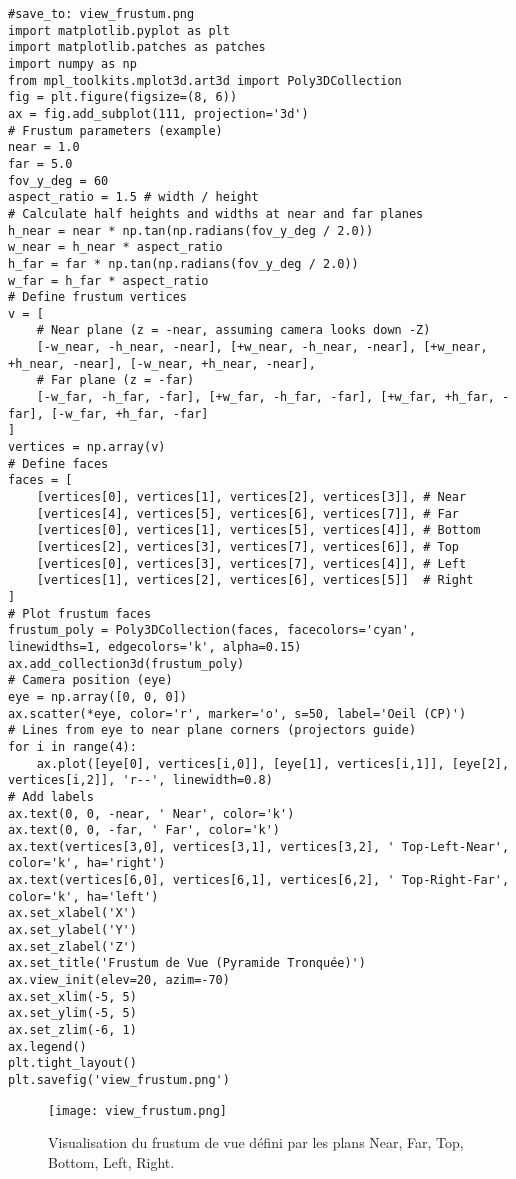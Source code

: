 \begin{verbatim}
#save_to: view_frustum.png
import matplotlib.pyplot as plt
import matplotlib.patches as patches
import numpy as np
from mpl_toolkits.mplot3d.art3d import Poly3DCollection
fig = plt.figure(figsize=(8, 6))
ax = fig.add_subplot(111, projection='3d')
# Frustum parameters (example)
near = 1.0
far = 5.0
fov_y_deg = 60
aspect_ratio = 1.5 # width / height
# Calculate half heights and widths at near and far planes
h_near = near * np.tan(np.radians(fov_y_deg / 2.0))
w_near = h_near * aspect_ratio
h_far = far * np.tan(np.radians(fov_y_deg / 2.0))
w_far = h_far * aspect_ratio
# Define frustum vertices
v = [
    # Near plane (z = -near, assuming camera looks down -Z)
    [-w_near, -h_near, -near], [+w_near, -h_near, -near], [+w_near, +h_near, -near], [-w_near, +h_near, -near],
    # Far plane (z = -far)
    [-w_far, -h_far, -far], [+w_far, -h_far, -far], [+w_far, +h_far, -far], [-w_far, +h_far, -far]
]
vertices = np.array(v)
# Define faces
faces = [
    [vertices[0], vertices[1], vertices[2], vertices[3]], # Near
    [vertices[4], vertices[5], vertices[6], vertices[7]], # Far
    [vertices[0], vertices[1], vertices[5], vertices[4]], # Bottom
    [vertices[2], vertices[3], vertices[7], vertices[6]], # Top
    [vertices[0], vertices[3], vertices[7], vertices[4]], # Left
    [vertices[1], vertices[2], vertices[6], vertices[5]]  # Right
]
# Plot frustum faces
frustum_poly = Poly3DCollection(faces, facecolors='cyan', linewidths=1, edgecolors='k', alpha=0.15)
ax.add_collection3d(frustum_poly)
# Camera position (eye)
eye = np.array([0, 0, 0])
ax.scatter(*eye, color='r', marker='o', s=50, label='Oeil (CP)')
# Lines from eye to near plane corners (projectors guide)
for i in range(4):
    ax.plot([eye[0], vertices[i,0]], [eye[1], vertices[i,1]], [eye[2], vertices[i,2]], 'r--', linewidth=0.8)
# Add labels
ax.text(0, 0, -near, ' Near', color='k')
ax.text(0, 0, -far, ' Far', color='k')
ax.text(vertices[3,0], vertices[3,1], vertices[3,2], ' Top-Left-Near', color='k', ha='right')
ax.text(vertices[6,0], vertices[6,1], vertices[6,2], ' Top-Right-Far', color='k', ha='left')
ax.set_xlabel('X')
ax.set_ylabel('Y')
ax.set_zlabel('Z')
ax.set_title('Frustum de Vue (Pyramide Tronquée)')
ax.view_init(elev=20, azim=-70)
ax.set_xlim(-5, 5)
ax.set_ylim(-5, 5)
ax.set_zlim(-6, 1)
ax.legend()
plt.tight_layout()
plt.savefig('view_frustum.png')
\end{verbatim}
\begin{figure}[H]
\centering
\texttt{[image: view\_frustum.png]}
\caption{Visualisation du frustum de vue défini par les plans Near, Far, Top, Bottom, Left, Right.}
\label{fig:view_frustum}
\end{figure}
